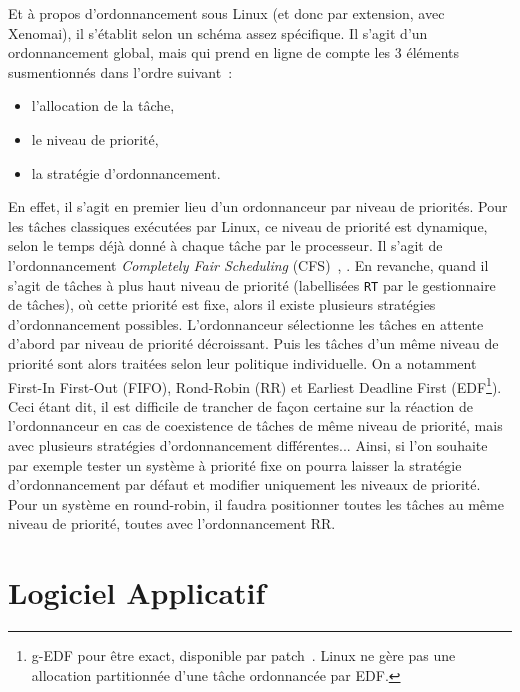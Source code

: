 \documentclass[french, a4paper, 11pt, twoside, pdftex]{StyleThese}
\begin{document}
        Et à propos d'ordonnancement sous Linux (et donc par extension, avec Xenomai), il s'établit selon un schéma assez spécifique\cite{ishkov_complete_2015}. Il s'agit d'un ordonnancement global, mais qui prend en ligne de compte les 3 éléments susmentionnés dans l'ordre suivant~:
        \begin{itemize}
        	\item l'allocation de la tâche,
        	\item le niveau de priorité,
        	\item la stratégie d'ordonnancement.
        \end{itemize}
    	En effet, il s'agit en premier lieu d'un ordonnanceur par niveau de priorités. Pour les tâches classiques exécutées par Linux, ce niveau de priorité est dynamique, selon le temps déjà donné à chaque tâche par le processeur. Il s'agit de l'ordonnancement \textit{Completely Fair Scheduling} (CFS)~\cite{wong_towards_2008}, \cite{pabla_completely_2009}. En revanche, quand il s'agit de tâches à plus haut niveau de priorité (labellisées \texttt{RT} par le gestionnaire de tâches), où cette priorité est fixe, alors il existe plusieurs stratégies d'ordonnancement possibles. L'ordonnanceur sélectionne les tâches en attente d'abord par niveau de priorité décroissant. Puis les tâches d'un même niveau de priorité sont alors traitées selon leur politique individuelle. On a notamment First-In First-Out (FIFO), Rond-Robin (RR) et Earliest Deadline First (EDF\footnote{g-EDF pour être exact, disponible par patch~\cite{lelli_efficient_2011}. Linux ne gère pas une allocation partitionnée d'une tâche ordonnancée par EDF.}). Ceci étant dit, il est difficile de trancher de façon certaine sur la réaction de l'ordonnanceur en cas de coexistence de tâches de même niveau de priorité, mais avec plusieurs stratégies d'ordonnancement différentes...
    	Ainsi, si l'on souhaite par exemple tester un système à priorité fixe on pourra laisser la stratégie d'ordonnancement par défaut et modifier uniquement les niveaux de priorité. Pour un système en round-robin, il faudra positionner toutes les tâches au même niveau de priorité, toutes avec l'ordonnancement RR.

                        
    \section{Logiciel Applicatif}
\end{document}
